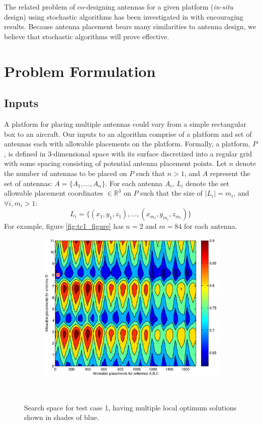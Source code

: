\documentclass[conference]{IEEEtran}
\begin{document}
The related problem of co-designing antennas for a given platform ({\em in-situ} design) using stochastic algorithms has been investigated in \cite{linden2000wire} with encouraging results. Because antenna placement bears many similarities to antenna design, we believe that stochastic algorithms will prove effective.

\section{Problem Formulation}
\label{sec:problem}
\subsection{Inputs}
\label{sec:inputs}
A platform for placing multiple antennas could vary from a simple rectangular box to an aircraft. Our inputs to an algorithm comprise of a platform and set of antennas each with allowable placements on the platform. Formally, a platform, $P$, is defined in 3-dimensional space with its surface discretized into a regular grid with some spacing consisting of potential antenna placement points. Let $n$ denote the number of antennas to be placed on $P$ such that $n>1$, and $A$ represent the set of antennas: $A = \{A_1, ..., A_n\}$. For each antenna $A_i$, $L_i$ denote the set allowable placement coordinates $\in \mathbb R^3$ on $P$ such that the size of $\mid L_i \mid =m_i$, and $ \forall i, m_i>1$:
\[
L_i = \{(x_{1}, y_{1}, z_{1}), ..., (x_{m_i}, y_{m_i}, z_{m_i})\}
\]
For example, figure \ref{fig:tc1_figure} has $n=2$ and $m=84$ for each antenna.
\begin{figure}%
    \begin{subfigure}{\columnwidth}
        \includegraphics[width=\columnwidth]{FIG/tc4_contour}%
    \end{subfigure}\hfill\\
    \caption{Search space for test case 1, having multiple local optimum solutions shown in shades of blue.}%
    \label{fig:tc1_ss}%
\end{figure}
\end{document}
